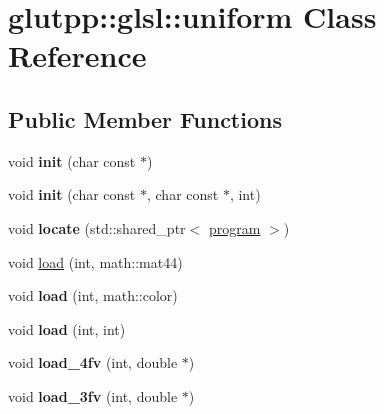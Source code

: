 \hypertarget{classglutpp_1_1glsl_1_1uniform}{\section{glutpp\-:\-:glsl\-:\-:uniform \-Class \-Reference}
\label{classglutpp_1_1glsl_1_1uniform}
}
\subsection*{\-Public \-Member \-Functions}
\begin{DoxyCompactItemize}
\item 
\hypertarget{classglutpp_1_1glsl_1_1uniform_ae056a10fba556c628130e229f79d3d5a}{void {\bfseries init} (char const $\ast$)}\label{classglutpp_1_1glsl_1_1uniform_ae056a10fba556c628130e229f79d3d5a}

\item 
\hypertarget{classglutpp_1_1glsl_1_1uniform_aa93039ae3ac2d378272b79d1a846baab}{void {\bfseries init} (char const $\ast$, char const $\ast$, int)}\label{classglutpp_1_1glsl_1_1uniform_aa93039ae3ac2d378272b79d1a846baab}

\item 
\hypertarget{classglutpp_1_1glsl_1_1uniform_a68d71397a7935ce2c5b9e17a1df9017f}{void {\bfseries locate} (std\-::shared\-\_\-ptr$<$ \hyperlink{classglutpp_1_1glsl_1_1program}{program} $>$)}\label{classglutpp_1_1glsl_1_1uniform_a68d71397a7935ce2c5b9e17a1df9017f}

\item 
void \hyperlink{classglutpp_1_1glsl_1_1uniform_a83c0f49028a3aed0072206192710d7f0}{load} (int, math\-::mat44)
\item 
\hypertarget{classglutpp_1_1glsl_1_1uniform_a4a56abb04ba45151dc705fb41137e73b}{void {\bfseries load} (int, math\-::color)}\label{classglutpp_1_1glsl_1_1uniform_a4a56abb04ba45151dc705fb41137e73b}

\item 
\hypertarget{classglutpp_1_1glsl_1_1uniform_a6aaade2efcf9fe8cde189f5566f2acbf}{void {\bfseries load} (int, int)}\label{classglutpp_1_1glsl_1_1uniform_a6aaade2efcf9fe8cde189f5566f2acbf}

\item 
\hypertarget{classglutpp_1_1glsl_1_1uniform_a8adc96b5850e1915cdd5103f40c41ee5}{void {\bfseries load\-\_\-4fv} (int, double $\ast$)}\label{classglutpp_1_1glsl_1_1uniform_a8adc96b5850e1915cdd5103f40c41ee5}

\item 
\hypertarget{classglutpp_1_1glsl_1_1uniform_ac4d666e370d6b10ad01db9cee3d165ab}{void {\bfseries load\-\_\-3fv} (int, double $\ast$)}\label{classglutpp_1_1glsl_1_1uniform_ac4d666e370d6b10ad01db9cee3d165ab}


\end{DoxyCompactItemize}
